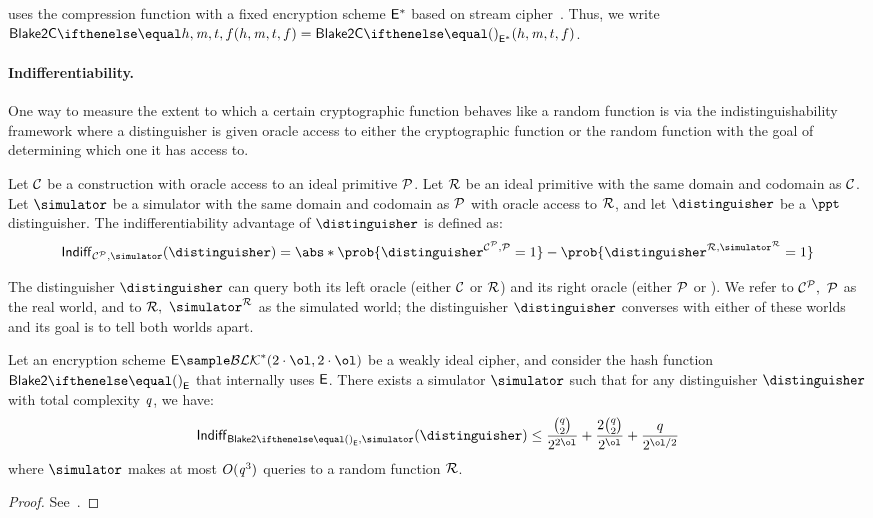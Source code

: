 \zeth{} uses the  compression function with a fixed encryption scheme $\mathsf{E}^*$ based on \chacha{} stream cipher~\cite{bernstein2008chacha}. Thus, we write $\blake{2C}{h, \msg, t, f} = \blake{2C}{}_{\Enc^*}(h, \msg, t, f)$.
%

\paragraph{Indifferentiability.}

One way to measure the extent to which a certain cryptographic function behaves like a random function is via the indistinguishability framework  where a distinguisher is given oracle access to either the cryptographic function or the random function with the goal of determining which one it has access to.

\begin{definition}\label{appendix:blake:secmod:WICM:indiff}
    Let $\mathcal{C}$ be a construction with oracle access to an ideal primitive $\mathcal{P}$. Let $\mathcal{R}$ be an ideal primitive with the same domain and codomain as $\mathcal{C}$. Let $\simulator$ be a simulator with the same domain and codomain as $\mathcal{P}$ with oracle access to $\mathcal{R}$, and let $\distinguisher$ be a $\ppt$ distinguisher. The indifferentiability advantage of $\distinguisher$ is defined as:
    \[
        \indiff_{\primC^\primP, \simulator}(\distinguisher) = \abs*{\prob{\distinguisher^{\primC^\primP, \primP} = 1} - \prob{\distinguisher^{\primR, \simulator^\primR} = 1}}
    \]
\end{definition}

The distinguisher $\distinguisher$ can query both its left oracle (either $\mathcal{C}$ or $\mathcal{R}$) and its right oracle (either $\mathcal{P}$ or \simulator). We refer to $\mathcal{C}^\mathcal{P},\ \mathcal{P}$ as the real world, and to $\primR,\ \simulator^\primR$ as the simulated world; the distinguisher $\distinguisher$ converses with either of these worlds and its goal is to tell both worlds apart.

\begin{theorem}
Let an encryption scheme $\Enc \sample \blockSet^*(2 \cdot \ol, 2 \cdot \ol)$ be a weakly ideal cipher, and consider the hash function $\blake{2}{}_\Enc$ that internally uses $\mathsf{E}$. There exists a simulator $\simulator$ such that for any distinguisher $\distinguisher$ with total complexity $\mathit{q}$, we have:
    \[
        \indiff_{\blake{2}{}_\Enc, \simulator}(\distinguisher) \leq \frac{\binom q 2}{2^{2\ol}} + \frac{2 \binom q 2}{2^{\ol}} + \frac{q}{2^{\ol/2}}
    \]
    where $\simulator$ makes at most $O(\mathit{q}^3)$ queries to a random function $\mathcal{R}$.
\end{theorem}
\begin{proof}
    See~\cite[Corollary 1]{luykx2016security}.
\end{proof}

